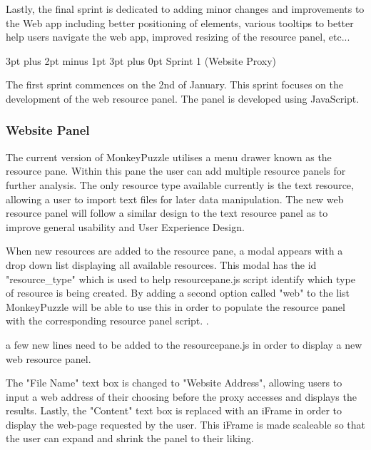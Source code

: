 \documentclass[12pt,a4paper]{article}
\makeatletter
\renewcommand\subsection{\@startsection {subsection}{1}{2mm} %
                               {3pt plus 2pt minus 1pt} %
                               {3pt plus 0pt} %
                               {\normalfont\bfseries}}
\makeatother
\begin{document}
Lastly, the final sprint is dedicated to adding minor changes and improvements to the Web app including better positioning of elements, various tooltips to better help users navigate the web app, improved resizing of the resource panel, etc... \newline


\newpage

\subsection{Sprint 1 (Website Proxy)}

The first sprint commences on the 2nd of January. This sprint focuses on the development of the web resource panel. The panel is developed using JavaScript.

\subsubsection{Website Panel}

The current version of MonkeyPuzzle utilises a menu drawer known as the resource pane. Within this pane the user can add multiple resource panels for further analysis. The only resource type available currently is the text resource, allowing a user to import text files for later data manipulation. The new web resource panel will follow a similar design to the text resource panel as to improve general usability and User Experience Design.\newline

When new resources are added to the resource pane, a modal appears with a drop down list displaying all available resources. This modal has the id "resource\_type" which is used to help resourcepane.js script identify which type of resource is being created. By adding a second option called "web" to the list MonkeyPuzzle will be able to use this in order to populate the resource panel with the corresponding resource panel script. \newline.

a few new lines need to be added to the resourcepane.js in order to display a new web resource panel.\newline




The "File Name" text box is changed to "Website Address", allowing users to input a web address of their choosing before the proxy accesses and displays the results. Lastly, the "Content" text box is replaced with an iFrame in order to display the web-page requested by the user. This iFrame is made scaleable so that the user can expand and shrink the panel to their liking.
\end{document}
